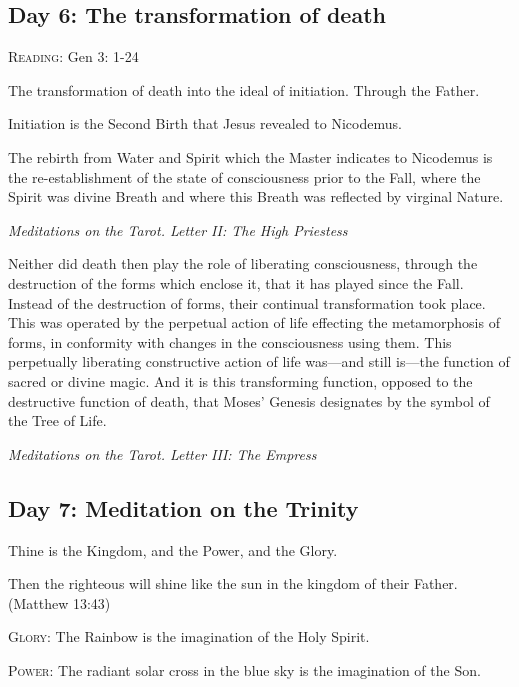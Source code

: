 \subsection*{Day 6: The transformation of death}
\textsc{Reading}: Gen 3: 1-24

The transformation of death into the ideal of initiation. Through the Father.

Initiation is the Second Birth that Jesus revealed to Nicodemus.

\begin{quotationx}
The rebirth from Water and Spirit which the Master indicates to Nicodemus is the re-establishment of the state of
consciousness prior to the Fall, where the Spirit was divine Breath and where this Breath was reflected by virginal
Nature. 
\begin{flushright}\textit{Meditations on the Tarot. Letter II: The High Priestess}\end{flushright} 

Neither did death then play the role of liberating consciousness, through the destruction of the forms which enclose it,
that it has played since the Fall. Instead of the destruction of forms, their continual transformation took place. This
was operated by the perpetual action of life effecting the metamorphosis of forms, in conformity with changes in the
consciousness using them. This perpetually liberating constructive action of life was—and still
is—the function of sacred or divine magic. And it is this transforming function, opposed to the
destructive function of death, that Moses' Genesis designates by the symbol of the Tree of Life.
\begin{flushright}\textit{Meditations on the Tarot. Letter III: The Empress}\end{flushright} 

\end{quotationx}

\subsection*{Day 7: Meditation on the Trinity}
Thine is the Kingdom, and the Power, and the Glory.

Then the righteous will shine like the sun in the kingdom of their Father. (Matthew 13:43)

\textsc{Glory}: The Rainbow is the imagination of the Holy Spirit.

\textsc{Power}: The radiant solar cross in the blue sky is the imagination of the Son.

